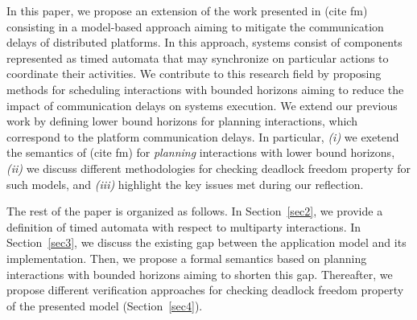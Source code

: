 \indent In this paper, we propose an extension of the work presented in (cite fm) 
consisting in a model-based approach aiming to mitigate the communication delays of 
distributed platforms. In this approach, systems consist of components represented 
as timed automata that may synchronize on particular actions to coordinate 
their activities. We contribute to this research field by proposing methods for 
scheduling interactions with bounded horizons aiming to reduce the impact of 
communication delays on systems execution.
We extend our previous work by defining lower bound horizons for planning interactions, 
which correspond to the platform communication delays.
In particular, \emph{(i)} we exetend the semantics of (cite fm) for \emph{planning} interactions with 
lower bound horizons, \emph{(ii)} we discuss different methodologies for checking deadlock 
freedom property for such models, and \emph{(iii)} highlight the key issues met during our reflection. 

The rest of the paper is organized as follows. In Section~\ref{sec2}, 
we provide a definition of timed automata with respect to multiparty interactions. 
In Section~\ref{sec3}, we discuss the existing gap between the application model and
its implementation. Then, we propose a formal semantics based on planning
interactions with bounded horizons aiming to shorten this gap.
Thereafter, we propose different verification approaches for checking deadlock
freedom property of the presented model (Section~\ref{sec4}). 

